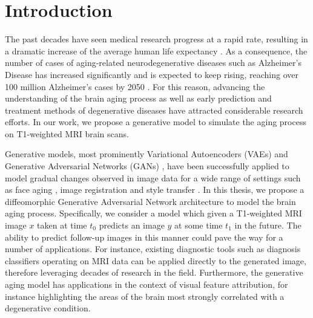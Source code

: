\chapter{Introduction}




The past decades have seen medical research progress at a rapid rate, resulting in a dramatic increase of the average human life expectancy \cite{owidlifeexpectancy}. As a consequence, the number of cases of aging-related neurodegenerative diseases such as Alzheimer's Disease has increased significantly and is expected to keep rising, reaching over 100 million Alzheimer's cases by 2050 \cite{brookmeyer2007forecasting}. For this reason, advancing the understanding of the brain aging process as well as early prediction and treatment methods of degenerative diseases have attracted considerable research efforts. In our work, we propose a generative model to simulate the aging process on T1-weighted MRI brain scans.

Generative models, most prominently Variational Autoencoders (VAEs) \cite{kingma2013auto} and Generative Adversarial Networks (GANs) \cite{goodfellow2014generative}, have been successfully applied to model gradual changes observed in image data for a wide range of settings such as face aging \cite{palsson2018generative}, image registration \cite{balakrishnan2019voxelmorph} and style transfer \cite{zhu2017unpaired}. In this thesis, we propose a diffeomorphic Generative Adversarial Network architecture to model the brain aging process. Specifically, we consider a model which given a T1-weighted MRI image $x$ taken at time $t_0$ predicts an image $y$ at some time $t_1$ in the future. The ability to predict follow-up images in this manner could pave the way for a number of applications. For instance, existing diagnostic tools such as diagnosis classifiers operating on MRI data can be applied directly to the generated image, therefore leveraging decades of research in the field. Furthermore, the generative aging model has applications in the context of visual feature attribution, for instance highlighting the areas of the brain most strongly correlated with a degenerative condition.

